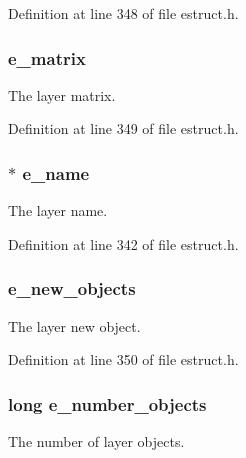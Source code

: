 Definition at line 348 of file estruct.\-h.

\hypertarget{struct__elayer_a62d53e14693deed3469c69dc3a857493}{
\subsubsection[{e\-\_\-matrix}]{ e\-\_\-matrix}}\label{struct__elayer_a62d53e14693deed3469c69dc3a857493}
The layer matrix. 

Definition at line 349 of file estruct.\-h.

\hypertarget{struct__elayer_a6d8c2140844c7949fe9bc0384b2129d8}{
\subsubsection[{e\-\_\-name}]{$\ast$ e\-\_\-name}}\label{struct__elayer_a6d8c2140844c7949fe9bc0384b2129d8}
The layer name. 

Definition at line 342 of file estruct.\-h.

\hypertarget{struct__elayer_a793a735e42cff87ab0df8772c76fe039}{
\subsubsection[{e\-\_\-new\-\_\-objects}]{ e\-\_\-new\-\_\-objects}}\label{struct__elayer_a793a735e42cff87ab0df8772c76fe039}
The layer new object. 

Definition at line 350 of file estruct.\-h.

\hypertarget{struct__elayer_ad5b10c31f81ecf9116b72b70b25f9e79}{
\subsubsection[{e\-\_\-number\-\_\-objects}]{\setlength{\rightskip}{0pt plus 5cm}long e\-\_\-number\-\_\-objects}}\label{struct__elayer_ad5b10c31f81ecf9116b72b70b25f9e79}
The number of layer objects. 

